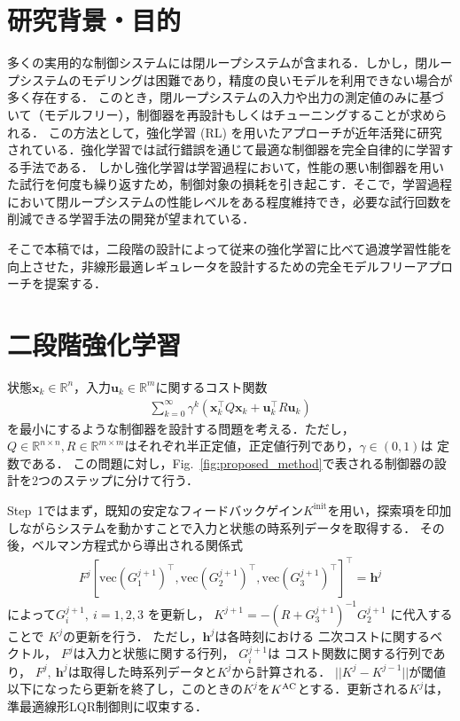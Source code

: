 \documentclass[twocolumn]{jarticle}
\newcommand{\rfig}[1]{Fig.~\ref{#1}}
\begin{document}
\maketitle

\section{研究背景・目的}
多くの実用的な制御システムには閉ループシステムが含まれる．しかし，閉ループシステムのモデリングは困難であり，精度の良いモデルを利用できない場合が多く存在する．
このとき，閉ループシステムの入力や出力の測定値のみに基づいて（モデルフリー），制御器を再設計もしくはチューニングすることが求められる．
この方法として，強化学習 \cite{Sutton_RL}(RL) を用いたアプローチが近年活発に研究されている\cite{Kiumarsi2018}．強化学習では試行錯誤を通じて最適な制御器を完全自律的に学習する手法である．
しかし強化学習は学習過程において，性能の悪い制御器を用いた試行を何度も繰り返すため，制御対象の損耗を引き起こす．そこで，学習過程において閉ループシステムの性能レベルをある程度維持でき，必要な試行回数を削減できる学習手法の開発が望まれている．

そこで本稿では，二段階の設計によって従来の強化学習\cite{Sutton_RL}に比べて過渡学習性能を向上させた，非線形最適レギュレータを設計するための完全モデルフリーアプローチを提案する．


\section{二段階強化学習}
状態$\bm{x}_{k} \in \mathbb{R}^{n}$，入力$\bm{u}_{k} \in \mathbb{R}^{m}$に関するコスト関数
\begin{align}
    \sum^{\infty}_{k=0} \gamma^{k} (\bm{x}_{k}^\top Q \bm{x}_{k} + \bm{u}_{k}^\top R \bm{u}_{k})
    \label{eq:cost_equation}
\end{align}
を最小にするような制御器を設計する問題を考える．ただし，$Q \in \mathbb{R}^{n \times n}, R \in \mathbb{R}^{m \times m}$はそれぞれ半正定値，正定値行列であり，$\gamma \in (0, 1)$は
定数である．
この問題に対し，\rfig{fig:proposed_method}で表される制御器の設計を2つのステップに分けて行う．

Step~1ではまず，既知の安定なフィードバックゲイン$K^{\mathrm{init}}$を用い，探索項を印加しながらシステムを動かすことで入力と状態の時系列データを取得する．
その後，ベルマン方程式から導出される関係式
\begin{align}
F ^j [\textrm{vec}(G^{j+1}_1)^\top ,\textrm{vec}(G^{j+1}_2)^\top ,\textrm{vec}(G^{j+1}_3)^\top]^\top=\bm{h}^j
\label{update_equation}
\end{align}
によって$G^{j+1}_i,~i=1,2,3$
を更新し，
$K^{j+1}=-(R+G_3^{j+1})^{-1}G_2^{j+1}$
に代入することで
$K^j$の更新を行う．
ただし，$\bm{h}^{j}$は各時刻における
二次コストに関するベクトル，
$F^{j}$は入力と状態に関する行列，
$G^{j+1}_i$は
コスト関数に関する行列であり，
$F^j,~ \bm{h}^j$は取得した時系列データと$K^j$から計算される．
$||K^j-K^{j-1}||$が閾値以下になったら更新を終了し，このときの$K^j$を$K^{\rm{AC}}$とする．更新される$K^{j}$は，準最適線形LQR制御則に収束する．
\end{document}
